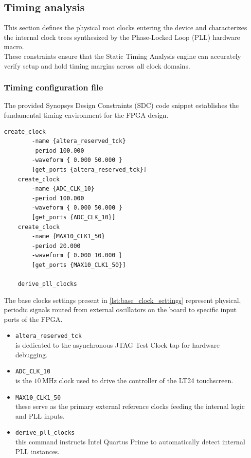 \newpage
\subsection{Timing analysis}

This section defines the physical root clocks entering the device and characterizes the internal clock trees synthesized by the Phase-Locked Loop (PLL) hardware macro. \\
These constraints ensure that the Static Timing Analysis engine can accurately verify setup and hold timing margins across all clock domains.

\subsubsection{Timing configuration file}

The provided Synopsys Design Constraints (SDC) code snippet establishes the fundamental timing environment for the FPGA design.

\vspace{1em}
\begin{lstlisting}[language=sdc, caption=Base clock settings for timing analyzer, label={lst:base_clock_settings}]
    create_clock    
        -name {altera_reserved_tck} 
        -period 100.000 
        -waveform { 0.000 50.000 } 
        [get_ports {altera_reserved_tck}]
    create_clock 
        -name {ADC_CLK_10} 
        -period 100.000 
        -waveform { 0.000 50.000 } 
        [get_ports {ADC_CLK_10}]
    create_clock    
        -name {MAX10_CLK1_50} 
        -period 20.000 
        -waveform { 0.000 10.000 } 
        [get_ports {MAX10_CLK1_50}]
                    
    derive_pll_clocks
\end{lstlisting}

\noindent
The base clocks settings present in \autoref{lst:base_clock_settings} represent physical, periodic signals routed from external oscillators on the board to specific input ports of the FPGA.

\begin{itemize}
    \item \texttt{altera\_reserved\_tck} \\
    is dedicated to the asynchronous JTAG Test Clock tap for hardware debugging. 

    \item \texttt{ADC\_CLK\_10} \\
    is the \(10\ \text{MHz}\) clock used to drive the controller of the LT24 touchscreen.
    
    \item \texttt{MAX10\_CLK1\_50} \\
    these serve as the primary external reference clocks feeding the internal logic and PLL inputs.

    \item \texttt{derive\_pll\_clocks} \\
    this command instructs Intel Quartus Prime to automatically detect internal PLL instances.

\end{itemize}

